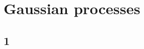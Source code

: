 \documentclass{article}
\begin{document}
\section{Gaussian processes}
  \subsection{1}
  
\end{document}
